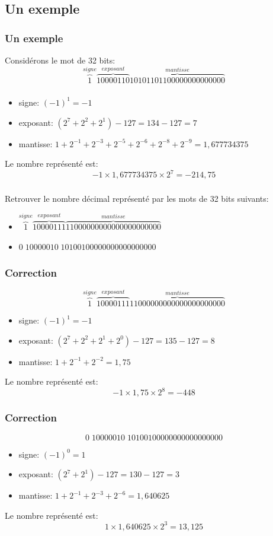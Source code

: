 \documentclass[svgnames,11pt]{beamer}
\begin{document}
\subsection{Un exemple}
\begin{frame}
    \frametitle{Un exemple}
    Considérons le mot de 32 bits:
    {\LARGE$$\overbrace{1}^{signe}\overbrace{10000110}^{exposant}\overbrace{10101101100000000000000}^{mantisse}$$}
    

\end{frame}
\begin{frame}
    \frametitle{}

    \begin{itemize}
        \item signe: $(-1)^1=-1$
        \item exposant: $(2^7+2^2+2^1)-127=134-127=7$
        \item mantisse: $1+2^{-1}+2^{-3}+2^{-5}+2^{-6}+2^{-8}+2^{-9} = 1,677734375$        
        \end{itemize}
        Le nombre représenté est:
        $$-1×1,677734375×2^7=-214,75$$
\end{frame}
\begin{frame}
    \frametitle{}

    \begin{activite}
    Retrouver le nombre décimal représenté par les mots de 32 bits suivants:
    \begin{itemize}
        \item {\Large $\overbrace{1}^{signe}\overbrace{10000111}^{exposant}\overbrace{11000000000000000000000}^{mantisse}$}
        \item {\Large$0\;10000010\;10100100000000000000000$}
    \end{itemize}
    \end{activite}

\end{frame}
\begin{frame}
    \frametitle{Correction}
    {\Large $$\overbrace{1}^{signe}\overbrace{10000111}^{exposant}\overbrace{11000000000000000000000}^{mantisse}$$}
    
\begin{itemize}
    \item signe: $(-1)^1=-1$
    \item exposant: $(2^7+2^2+2^1+2^0)-127=135-127=8$
    \item mantisse: $1+2^{-1}+2^{-2} = 1,75$
\end{itemize}
Le nombre représenté est:
        $$-1×1,75×2^8=-448$$
\end{frame}
\begin{frame}
    \frametitle{Correction}
    {\Large$$0\;10000010\;10100100000000000000000$$}
    
\begin{itemize}
    \item signe: $(-1)^0=1$
    \item exposant: $(2^7+2^1)-127=130-127=3$
    \item mantisse: $1+2^{-1}+2^{-3}+2^{-6} = 1,640625$
\end{itemize}
Le nombre représenté est:
        $$1×1,640625×2^3=13,125$$
\end{frame}
\end{document}

